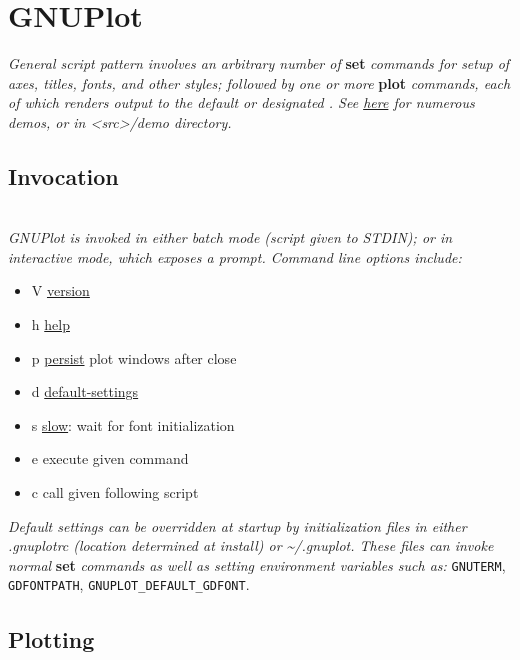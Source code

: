 \section{GNUPlot}
\textit{General script pattern involves an arbitrary number of }\textbf{set}\textit{ commands for setup of axes, titles, fonts, and other styles; followed by one or more }\textbf{plot}\textit{ commands, each of which renders output to the default or designated . See \href{http://gnuplot.info/demos/}{here} for numerous demos, or in <src>/demo directory.}


\subsection*{Invocation}
\\
\textit{GNUPlot is invoked in either batch mode (script given to STDIN); or in interactive mode, which exposes a prompt. Command line options include:}\
\begin{itemize}[label=-]
    \item V \quad \ul{version}
    \item h \quad \ul{help}
    \item p \quad \ul{persist} plot windows after close 
    \item d \quad \ul{default-settings}
    \item s \quad \ul{slow}: wait for font initialization
    \item e \quad execute given command
    \item c \quad call given following script
\end{itemize}
\textit{Default settings can be overridden at startup by initialization files in either .gnuplotrc (location determined at install) or \textasciitilde /.gnuplot. These files can invoke normal }\textbf{set}\textit{ commands as well as setting environment variables such as: } \texttt{GNUTERM}, \texttt{GDFONTPATH}, \texttt{GNUPLOT\_DEFAULT\_GDFONT}. \\


\subsection*{Plotting} 

